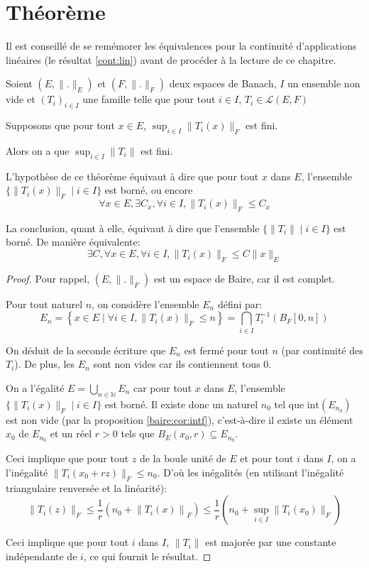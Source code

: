 \section{Théorème}

Il est conseillé de se remémorer les équivalences pour
la continuité d'applications linéaires (le résultat
\ref{cont:lin}) avant de procéder à la lecture de ce
chapitre.


\begin{thm}
  Soient $(E, \|.\|_E)$ et $(F, \|.\|_F)$ deux espaces de Banach,
  $I$ un ensemble non vide et $(T_i)_{i\in I}$ une famille telle que
  pour tout $i\in I$, $T_i\in \mathscr{L}(E, F)$

  Supposons que pour tout $x\in E$, $\sup_{i\in I}\|T_i(x)\|_F$ est fini.

  Alors on a que $\sup_{i\in I}\|T_i\|$ est fini.
\end{thm}

L'hypothèse de ce théorème équivaut à dire que pour tout $x$ dans $E$,
l'ensemble $\{\|T_i(x)\|_F\mid i\in I\}$ est borné, ou encore
$$\forall x\in E, \exists C_x, \forall i\in I, \|T_i(x)\|_F \leq C_x$$

La conclusion, quant à elle, équivaut à dire que l'ensemble
$\{\|T_i\|\mid i\in I\}$ est borné. De manière équivalente:
$$\exists C, \forall x\in E, \forall i\in I, \|T_i(x)\|_F\leq C\|x\|_E$$

\begin{proof}
  Pour rappel, $(E, \|.\|_F)$ est un espace de Baire, car il est complet.

  Pour tout naturel $n$, on considère l'ensemble $E_n$ défini par:
  $$E_n = \left\{x\in E\mid \forall i\in I, \|T_i(x)\|_F\leq n\right\}
  =\bigcap_{i\in I}T_i^{-1}(B_F[0, n])$$

  On déduit de la seconde écriture que $E_n$ est
  fermé pour tout $n$ (par continuité des $T_i$). De plus,
  les $E_n$ sont non vides car ils contiennent tous $0$.

  On a l'égalité $E = \bigcup_{n\in\mathbb N}E_n$ car pour tout
  $x$ dans $E$, l'ensemble $\{\|T_i(x)\|_F\mid i\in I\}$ est borné.
  Il existe donc un naturel $n_0$ tel que $\mathrm{int}(E_{n_0})$
  est non vide (par la proposition \ref{baire:cor:intf}),
  c'est-à-dire il existe
  un élément $x_0$ de $E_{n_0}$ et un réel $r>0$ tels que $B_E(x_0, r)
  \subseteq E_{n_0}$.

  Ceci implique que pour tout $z$ de la boule unité de $E$ et
  pour tout $i$ dans $I$, on a l'inégalité
  $\|T_i(x_0 + r z)\|_F\leq n_0$. D'où les inégalités (en utilisant
  l'inégalité triangulaire renversée et la linéarité):
  $$\|T_i(z)\|_F \leq \frac 1 r \left( n_0 + \left\|T_i (x)\right\|_F \right) \leq
  \frac{1}{r} \left( n_0 + \sup_{i\in I}\|T_i(x_0)\|_F \right)$$

  Ceci implique que pour tout $i$ dans $I$, $\|T_i\|$ est
  majorée par une constante indépendante de $i$, ce qui
  fournit le résultat.

\end{proof}

